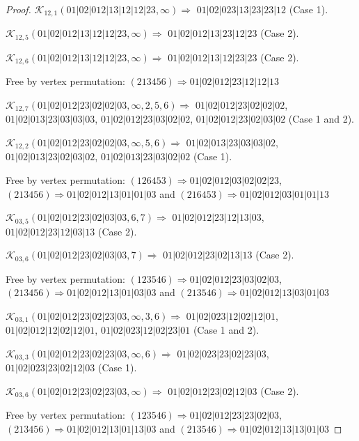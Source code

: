 \documentclass[12pt]{article}
\theoremstyle{plain}
\theoremstyle{definition}
\theoremstyle{remark}
\newcommand{\fancy}[1]{\mathcal{#1}}
\def\K{\fancy{K}}
\begin{document}
\begin{proof}
	$\K_{12,1}(01|02|012|13|12|12|23,\infty)\Rightarrow $ $01|02|023|13|23|23|12$ (Case 1).
	
	$\K_{12,5}(01|02|012|13|12|12|23,\infty)\Rightarrow $ $01|02|012|13|23|12|23$ (Case 2).
	
	$\K_{12,6}(01|02|012|13|12|12|23,\infty)\Rightarrow $ $01|02|012|13|12|23|23$ (Case 2).
	
	
	
	Free by vertex permutation: $(2 1 3 4 5 6)\Rightarrow 01|02|012|23|12|12|13$
	
	
	
	\bigskip
	
	$\K_{12,7}(01|02|012|23|02|02|03,\infty,2, 5, 6)\Rightarrow $ $01|02|012|23|02|02|02$, $01|02|013|23|03|03|03$, $01|02|012|23|03|02|02$, $01|02|012|23|02|03|02$ (Case 1 and 2).
	
	$\K_{12,2}(01|02|012|23|02|02|03,\infty,5, 6)\Rightarrow $ $01|02|013|23|03|03|02$, $01|02|013|23|02|03|02$, $01|02|013|23|03|02|02$ (Case 1).
	
	
	
	Free by vertex permutation: $(1 2 6 4 5 3)\Rightarrow 01|02|012|03|02|02|23$, $(2 1 3 4 5 6)\Rightarrow 01|02|012|13|01|01|03$ and $(2 1 6 4 5 3)\Rightarrow 01|02|012|03|01|01|13$
	
	
	
	\bigskip
	
	$\K_{03,5}(01|02|012|23|02|03|03,6, 7)\Rightarrow $ $01|02|012|23|12|13|03$, $01|02|012|23|12|03|13$ (Case 2).
	
	$\K_{03,6}(01|02|012|23|02|03|03,7)\Rightarrow $ $01|02|012|23|02|13|13$ (Case 2).
	
	
	
	Free by vertex permutation: $(1 2 3 5 4 6)\Rightarrow 01|02|012|23|03|02|03$, $(2 1 3 4 5 6)\Rightarrow 01|02|012|13|01|03|03$ and $(2 1 3 5 4 6)\Rightarrow 01|02|012|13|03|01|03$
	
	
	
	\bigskip
	
	$\K_{03,1}(01|02|012|23|02|23|03,\infty,3, 6)\Rightarrow $ $01|02|023|12|02|12|01$, $01|02|012|12|02|12|01$, $01|02|023|12|02|23|01$ (Case 1 and 2).
	
	$\K_{03,3}(01|02|012|23|02|23|03,\infty,6)\Rightarrow $ $01|02|023|23|02|23|03$, $01|02|023|23|02|12|03$ (Case 1).
	
	$\K_{03,6}(01|02|012|23|02|23|03,\infty)\Rightarrow $ $01|02|012|23|02|12|03$ (Case 2).
	
	
	
	Free by vertex permutation: $(1 2 3 5 4 6)\Rightarrow 01|02|012|23|23|02|03$, $(2 1 3 4 5 6)\Rightarrow 01|02|012|13|01|13|03$ and $(2 1 3 5 4 6)\Rightarrow 01|02|012|13|13|01|03$
	

\end{proof}
\end{document}
